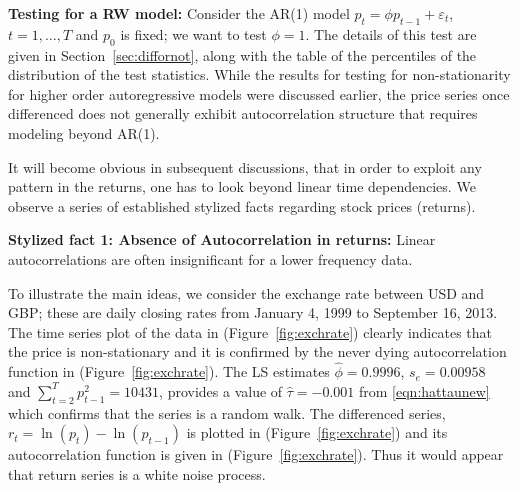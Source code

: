 \noindent\textbf{Testing for a RW model:} \label{in:nonstat3} Consider the AR(1) model $p_t = \phi p_{t-1} + \varepsilon_t$, $t = 1,\ldots,T$ and $p_0$ is fixed; we want to test $\phi = 1$. The details of this test are given in Section~\ref{sec:diffornot}, along with the table of the percentiles of the distribution of the test statistics. While the results for testing for non-stationarity for higher order autoregressive models were discussed earlier, the price series once differenced does not generally exhibit autocorrelation structure that requires modeling beyond AR(1).


It will become obvious in subsequent discussions, that in order to exploit any pattern in the returns, one has to look beyond linear time dependencies. We observe a series of established stylized facts regarding stock prices (returns). \twomedskip


\noindent\textbf{Stylized fact 1: Absence of Autocorrelation in returns:} Linear autocorrelations are often insignificant for a lower frequency data. 


To illustrate the main ideas, we consider the exchange rate between USD and GBP; these are daily closing rates from January 4, 1999 to September 16, 2013. The time series plot of the data in (Figure~\ref{fig:exchrate}) clearly indicates that the price is non-stationary and it is confirmed by the never dying autocorrelation function in (Figure~\ref{fig:exchrate}). The LS estimates $\hat{\phi}= 0.9996$, $s_e= 0.00958$ and $\sum_{t=2}^T p_{t-1}^2 = 10431$, provides a value of $\hat{\tau} = -0.001$ from \eqref{eqn:hattaunew} which confirms that the series is a random walk. The differenced series, $r_t = \ln{(p_t)} - \ln{(p_{t-1})}$ is plotted in (Figure~\ref{fig:exchrate}) and its autocorrelation function is given in (Figure~\ref{fig:exchrate}). Thus it would appear that return series is a white noise process.


